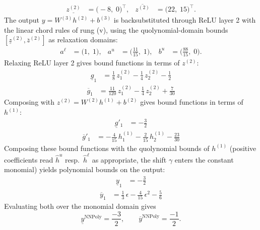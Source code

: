 \documentclass[11pt]{article}
\begin{document}
\begin{align*}
\underline{z^{(2)}} &= \bigl(-8,\; 0\bigr)^{\!\top}, & \overline{z^{(2)}} &= \bigl(22,\; 15\bigr)^{\!\top}.
\end{align*}
The output $y = W^{(3)} h^{(2)} + b^{(3)}$ is backsubstituted through ReLU layer 2 with the linear chord rules of rung (v), using the quolynomial-domain bounds
$[\underline{z}^{(2)}, \overline{z}^{(2)}]$ as relaxation domains:
\begin{align*}
a^{\ell} &= \bigl(1,\; 1\bigr), & a^{u} &= \bigl(\frac{11}{15},\; 1\bigr), & b^{u} &= \bigl(\frac{88}{15},\; 0\bigr).
\end{align*}
Relaxing ReLU layer 2 gives bound functions in terms of $z^{(2)}$:
\begin{align*}
\underline{g}_{1} &= \frac{1}{8}\,z^{(2)}_{1} - \frac{1}{4}\,z^{(2)}_{2} - \frac{1}{2}
\end{align*}
\begin{align*}
\overline{g}_{1} &= \frac{11}{120}\,z^{(2)}_{1} - \frac{1}{4}\,z^{(2)}_{2} + \frac{7}{30}
\end{align*}
Composing with $z^{(2)} = W^{(2)} h^{(1)} + b^{(2)}$ gives bound functions in terms of $h^{(1)}$:
\begin{align*}
\underline{g}'_{1} &= -\frac{3}{2}
\end{align*}
\begin{align*}
\overline{g}'_{1} &= -\frac{4}{15}\,h^{(1)}_{1} - \frac{2}{15}\,h^{(1)}_{2} - \frac{23}{30}
\end{align*}
Composing these bound functions with the quolynomial bounds of $h^{(1)}$ (positive
coefficients read $\hat{h}^{u}$ resp.\ $\hat{h}^{\ell}$ as appropriate, the shift $\gamma$ enters the
constant monomial) yields polynomial bounds on the output:
\begin{align*}
\underline{y}_{1} &= -\frac{3}{2}
\end{align*}
\begin{align*}
\overline{y}_{1} &= \frac{1}{3}\,\epsilon - \frac{4}{15}\,\epsilon^2 - \frac{5}{6}
\end{align*}
Evaluating both over the monomial domain gives
\begin{equation*}
\underline{y}^{\text{NNPoly}} = \frac{-3}{2}, \qquad \overline{y}^{\text{NNPoly}} = \frac{-1}{2}.
\end{equation*}
\end{document}
